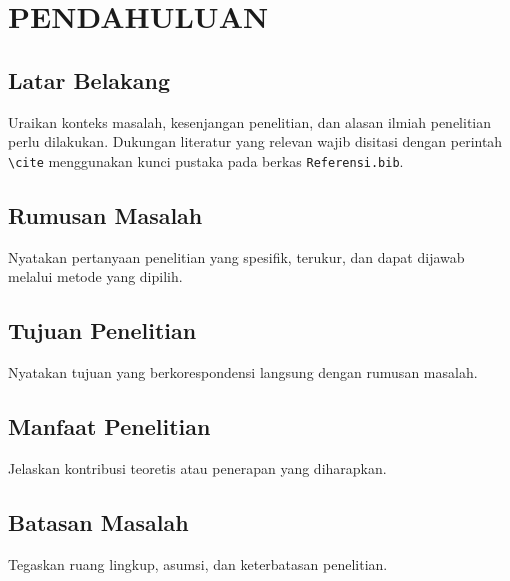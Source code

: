 \chapter{PENDAHULUAN}
\section{Latar Belakang}
Uraikan konteks masalah, kesenjangan penelitian, dan alasan ilmiah penelitian perlu dilakukan. Dukungan literatur yang relevan wajib disitasi dengan perintah \texttt{\textbackslash cite} menggunakan kunci pustaka pada berkas \texttt{Referensi.bib}.
\section{Rumusan Masalah}
Nyatakan pertanyaan penelitian yang spesifik, terukur, dan dapat dijawab melalui metode yang dipilih.
\section{Tujuan Penelitian}
Nyatakan tujuan yang berkorespondensi langsung dengan rumusan masalah.
\section{Manfaat Penelitian}
Jelaskan kontribusi teoretis atau penerapan yang diharapkan.
\section{Batasan Masalah}
Tegaskan ruang lingkup, asumsi, dan keterbatasan penelitian.
